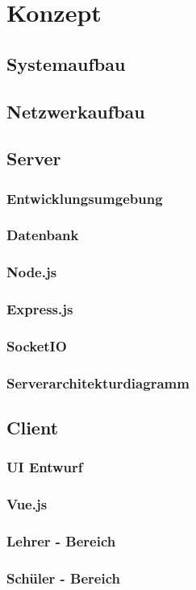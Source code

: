 \section{Konzept}\label{sec:konzept}

\subsection{Systemaufbau}\label{sec:sysaufbau}
\subsection{Netzwerkaufbau}\label{sec:netzwerkaufbau}
\subsection{Server}\label{sec:serverkonzept}
\subsubsection{Entwicklungsumgebung}\label{sec:umgebung}
\subsubsection{Datenbank}\label{sec:datenbank}
\subsubsection{Node.js}\label{sec:nodejs}
\subsubsection{Express.js}\label{sec:expressjs}
\subsubsection{SocketIO}\label{sec:socketio}
\subsubsection{Serverarchitekturdiagramm}\label{sec:serverarchitekt}
\subsection{Client}\label{sec:clientkonzept}
\subsubsection{UI Entwurf}\label{sec:uientwurf}
\subsubsection{Vue.js}\label{sec:vuejs}
\subsubsection{Lehrer - Bereich}\label{sec:lehrerbereich}
\subsubsection{Schüler - Bereich}\label{sec:schuelerbereich}